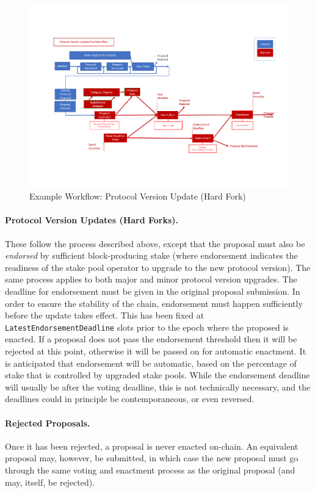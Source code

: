 \begin{figure}
  \includegraphics[trim=0 90 0 80,clip,width=\textwidth]{New-Workflow2}
  \caption{Example Workflow: Protocol Version Update (Hard Fork)}
  \label{fig:workflow-hf}
\end{figure}

\paragraph{Protocol Version Updates (Hard Forks).}  These follow the process described above,
except that the proposal must also be \emph{endorsed} by sufficient block-producing stake
(where endorsement indicates the readiness of the stake pool operator to upgrade to the new protocol version).
The same process applies to both major and minor protocol version upgrades.
The deadline for endorsement must be given in the original proposal submission.
In order to ensure the stability of the chain, endorsement must happen sufficiently before the update takes
effect.  This has been fixed at \texttt{LatestEndorsementDeadline} slots prior to the epoch where the proposed is enacted.
If a proposal does not pass the endorsement threshold then it will be rejected at this point, otherwise it will be
passed on for automatic enactment.  It is anticipated that endorsement will be automatic, based on the percentage of stake that
is controlled by upgraded stake pools.
While the endorsement deadline will usually be after the voting deadline, this is not technically necessary, and the deadlines could
in principle be contemporaneous, or even reversed.

\paragraph{Rejected Proposals.}   Once it has been rejected, a proposal is never enacted on-chain.
An equivalent proposal may, however, be submitted, in which case the new proposal must go through the same voting and enactment process
as the original proposal (and may, itself, be rejected).
